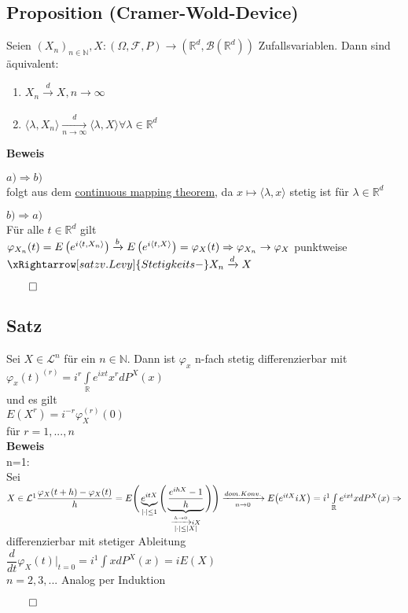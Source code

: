 \documentclass[german,10pt,oneside, fleqn, a4paper]{article}
\newcommand {\R}	{\mathbb{R}}
\newcommand {\N}	{\mathbb{N}}
\newcommand{\Ra}	{\Rightarrow}
\newcommand{\ra}{\rightarrow}
\newcommand{\brc}[1]{\left(#1\right)}
\newcommand{\folge}[3][\N]{\left(#2_#3\right)_{#3\in #1}}
\newcommand{\QED}{\begin{flushright}$\qed$\end{flushright}}
\newcommand{\mc}[1]{\mathcal{#1}}
\newcommand{\lp}[1]{\mc{L}^{#1}}
\newcommand{\beweis}{\textbf{Beweis}\\}
\newcommand{\toinf}{\rightarrow\infty}
\newcommand{\1}[1]{1_{#1}}
\newcommand{\2}[1]{\1{\brac{#1}}}
\newcommand{\xr}[2][]{\xrightarrow[#1]{#2}}
\newcommand{\rbor}[1][d]{\brc{\R^{#1},\mc{B}\brc{\R^{#1}}}}
\newcommand{\raum}{\brc{\Omega,\mc{F},P}}
\newcommand{\intr}{\int\limits_\R}
\begin{document}
\subsection{Proposition (Cramer-Wold-Device)}
\label{4.13}
Seien $\folge{X}{n}, X:\raum\ra\rbor$ Zufallsvariablen. Dann sind äquivalent:\begin{enumerate}[label=(\alph*)]
\item $X_n\xr{d}X, n\toinf$
\item $\langle \lambda,X_n\rangle\xr[n\toinf]{d}\langle\lambda,X\rangle\forall\lambda\in\R^d$
\end{enumerate}
\beweis
\begin{list}{•}{}
\item $a)\Ra b)$\\
folgt aus dem \hyperref[2.6]{continuous mapping theorem}, da $x\mapsto\langle \lambda,x\rangle$ stetig ist für $\lambda\in\R^d$
\item $b)\Ra a)$\\
Für alle $t\in\R^d$ gilt\\
$\varphi_{X_n}(t)=E\brc{e^{i\langle t,X_n\rangle}}\xr{b}E\brc{e^{i\langle t,X\rangle}}=\varphi_X(t)\\
\Ra \varphi_{X_n}\ra\varphi_X$ punktweise $\xRightarrow[satz v. Levy]{Stetigkeits-} X_n\xr{d}X$\QED
\end{list}
\subsection{Satz}
\label{4.14}
Sei $X\in\lp{n}$ für ein $n\in\N$. Dann ist $\varphi_x$ n-fach stetig differenzierbar mit \\
$\varphi_x(t)^{(r)}=i^r\intr e^{ixt}x^rdP^X(x)$\\
und es gilt\\
$E(X^r)=i^{-r}\varphi_X^{(r)}(0)$\\
für $r=1,...,n$\\
\beweis
n=1: \\
Sei $X\in\lp{1}\\
\dfrac{\varphi_X(t+h)-\varphi_X(t)}{h}=E\Bigg(\underbrace{e^{itX}}_{|\cdot|\leq 1}\Bigg(\underbrace{\dfrac{e^{ihX}-1}{h}}_{\substack{\xr{h\ra0}iX\\|\cdot|\leq|X|}}\Bigg)\Bigg)\\
\xr[n\ra0]{dom.Konv.}E\big(e^{itX}iX\big)=i^1\intr e^{ixt}xdP^X(x)\\
\Ra$ differenzierbar mit stetiger Ableitung\\
$\dfrac{d}{dt}\varphi_X(t)\Bigg|_{t=0}=i^1\int xdP^X(x)=iE(X)$\\
$n=2,3,...$ Analog per Induktion\QED
\end{document}
